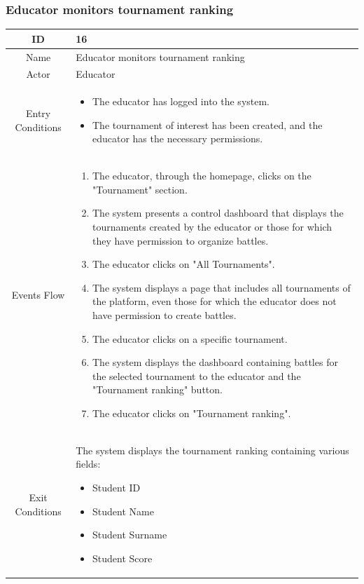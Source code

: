 \subsubsection{Educator monitors tournament ranking}

\begin{longtable}{|c| p{10cm}|}
    \hline
        ID & 16 \\
    \hline
        Name & Educator monitors tournament ranking \\
    \hline
        Actor & Educator \\
    \hline
        Entry Conditions & 
            \begin{itemize}
                \item The educator has logged into the system.
                \item The tournament of interest has been created, and the educator has the necessary permissions.
            \end{itemize}\\
    \hline
        Events Flow &   \begin{enumerate}
                            \item The educator, through the homepage, clicks on the "Tournament" section.
                            \item The system presents a control dashboard that displays the tournaments created by the educator or those for which they have permission to organize battles.
                            \item The educator clicks on "All Tournaments".
                            \item The system displays a page that includes all tournaments of the platform, even those for which the educator does not have permission to create battles.
                            \item The educator clicks on a specific tournament.
                            \item The system displays the dashboard containing battles for the selected tournament to the educator and the "Tournament ranking" button.
                            \item The educator clicks on "Tournament ranking".
                        \end{enumerate} \\
    \hline
        Exit Conditions &

            The system displays the tournament ranking containing various fields:
            \begin{itemize}
                                \item Student ID
                                \item Student Name
                                \item Student Surname
                                \item Student Score 
                            \end{itemize}
\\
    \hline
\end{longtable}


